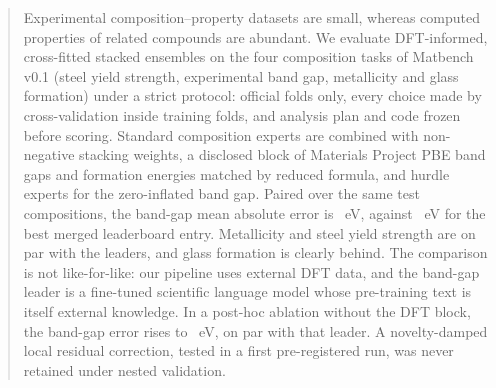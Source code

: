 \begin{abstract}
Experimental composition--property datasets are small, whereas computed properties of related compounds are abundant.
We evaluate DFT-informed, cross-fitted stacked ensembles on the four composition tasks of Matbench v0.1 (steel yield strength, experimental band gap, metallicity and glass formation) under a strict protocol: official folds only, every choice made by cross-validation inside training folds, and analysis plan and code frozen before scoring.
Standard composition experts are combined with non-negative stacking weights, a disclosed block of Materials Project PBE band gaps and formation energies matched by reduced formula, and hurdle experts for the zero-inflated band gap.
Paired over the same test compositions, the band-gap mean absolute error is \AtwoFinalGap{}~eV, against \AtwoLeaderGap{}~eV for the best merged leaderboard entry. Metallicity and steel yield strength are on par with the leaders, and glass formation is clearly behind.
The comparison is not like-for-like: our pipeline uses external DFT data, and the band-gap leader is a fine-tuned scientific language model whose pre-training text is itself external knowledge.
In a post-hoc ablation without the DFT block, the band-gap error rises to \AblNoDftGap{}~eV, on par with that leader.
A novelty-damped local residual correction, tested in a first pre-registered run, was never retained under nested validation.
\end{abstract}
